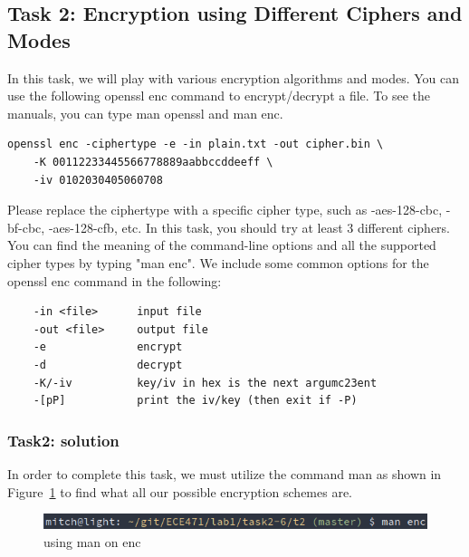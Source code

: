 \documentclass[12pt]{article}
\begin{document}
\clearpage
\subsection{Task 2: Encryption using Different Ciphers and Modes}

In this task, we will play with various encryption algorithms and modes. You can use the following
openssl enc command to encrypt/decrypt a file. To see the manuals, you can type man openssl
and man enc.

\begin{verbatim}
openssl enc -ciphertype -e -in plain.txt -out cipher.bin \
    -K 00112233445566778889aabbccddeeff \
    -iv 0102030405060708 
\end{verbatim}

Please replace the ciphertype with a specific cipher type, such as -aes-128-cbc, -bf-cbc,
-aes-128-cfb, etc. In this task, you should try at least 3 different ciphers. You can find the meaning
of the command-line options and all the supported cipher types by typing "man enc". We include some
common options for the openssl enc command in the following:
\begin{verbatim}
    -in <file>      input file
    -out <file>     output file
    -e              encrypt
    -d              decrypt
    -K/-iv          key/iv in hex is the next argumc23ent
    -[pP]           print the iv/key (then exit if -P)
\end{verbatim}

\subsubsection{Task2: solution}

In order to complete this task, we must utilize the command man as shown in Figure~\ref{fig:t2p0} to find what all our
possible encryption schemes are.

\begin{figure}[H]
    \begin{center}
        \includegraphics[scale=0.7]{t2p0.png}
    \end{center}{}
    \caption{using man on enc}
    \label{fig:t2p0}
\end{figure}
\end{document}
